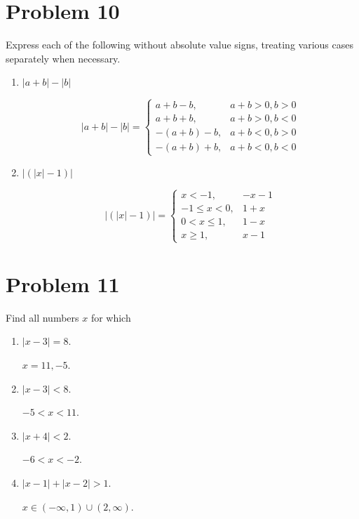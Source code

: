 \documentclass{article}
\begin{document}
\section{Problem 10}
Express each of the following without absolute value signs, treating various cases separately when necessary.
\begin{enumerate}

    \item  $|a + b| - |b|$

        \[
        |a + b| - |b| =
        \begin{cases}
            a + b - b, & a + b > 0, b > 0 \\

            a + b +b, & a + b > 0, b < 0 \\

            -(a + b) - b, & a + b < 0, b > 0 \\

            -(a + b) + b, & a + b < 0, b < 0

        \end{cases}
        \]

    \item $|(|x| - 1)|$

        \[
        |(|x| - 1)| =
        \begin{cases}
            
            x < -1, & -x - 1 \\

            -1 \leq x < 0, & 1 + x \\

            0 < x \leq 1, & 1-x \\

            x \geq 1, & x - 1
        \end{cases}
    \]
\end{enumerate}

\section{Problem 11}
Find all numbers $x$ for which
\begin{enumerate}

    \item $|x-3| = 8$.

        $x = 11, -5$.

    \item $|x-3| < 8$.

        $-5 < x < 11$.

    \item $|x + 4| < 2$.

        $-6< x < -2$.

    \item $|x-1| + |x-2| > 1$.

        $x \in (- \infty, 1) \cup (2, \infty)$.

\end{enumerate}
\end{document}
